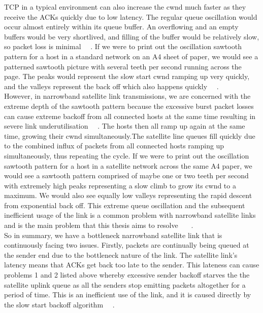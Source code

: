 TCP in a typical environment can also increase the cwnd much faster as they receive the ACKs quickly due to low latency. The regular queue oscillation would occur almost entirely within its queue buffer. An overflowing and an empty buffers would be very shortlived, and filling of the buffer would be relatively slow, so packet loss is minimal ~\cite{1}~\cite{2}. If we were to print out the oscillation sawtooth pattern for a host in a standard network on an A4 sheet of paper, we would see a patterned sawtooth picture with several teeth per second running across the page. The peaks would represent the slow start cwnd ramping up very quickly, and the valleys represent the back off which also happens quickly ~\cite{1}~\cite{2}. \\

However, in narrowband satellite link transmissions, we are concerned with the extreme depth of the sawtooth pattern because the excessive burst packet losses can cause extreme backoff from all connected hosts at the same time resulting in severe link underutilisation ~\cite{4}~\cite{5}. The hosts then all ramp up again at the same time, growing their cwnd simultaneously.The satellite line queues fill quickly due to the combined influx of packets from all connected hosts ramping up simultaneously, thus repeating the cycle. If we were to print out the oscillation sawtooth pattern for a host in a satellite network across the same A4 paper, we would see a sawtooth pattern comprised of maybe one or two teeth per second with extremely high peaks representing a slow climb to grow its cwnd to a maximum. We would also see equally low valleys representing the rapid descent from exponential back off. This extreme queue oscillation and the subsequent inefficient usage of the link is a common problem with narrowband satellite links and is the main problem that this thesis aims to resolve ~\cite{4}~\cite{5}~\cite{8}.\\

So in summary, we have a bottleneck narrowband satellite link that is continuously facing two issues. Firstly, packets are continually being queued at the sender end due to the bottleneck nature of the link. The satellite link's latency means that ACKs get back too late to the sender. This lateness can cause problems 1 and 2 listed above whereby excessive sender backoff starves the the satellite uplink queue as all the senders stop emitting packets altogether for a period of time. This is an inefficient use of the link, and it is caused directly by the slow start backoff algorithm ~\cite{5}~\cite{15}. \\


